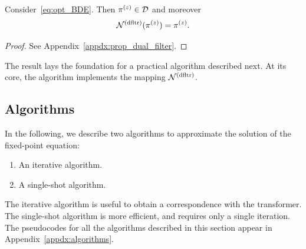 \documentclass[twoside,11pt]{article}
\def\clD{{\cal D}}
\def\clD{{\cal D}}
\def\clN{{\cal N}}
\def\dfltr{{\text{\rm (dfltr)}}}
\begin{document}
\begin{proposition}\label{prop:dual_filter}
Consider~\eqref{eq:opt_BDE}.  Then $\pi^{(z)}\in \clD$ and moreover
  \begin{equation*}
  \clN^\dfltr (\pi^{(z)}) = \pi^{(z)}.
  \end{equation*}
\end{proposition}
\begin{proof}
  See Appendix~\ref{appdx:prop_dual_filter}.
\end{proof}

The result lays the foundation for a practical algorithm described next.  At its core, the 
algorithm implements the mapping $\clN^\dfltr$.



\subsection{Algorithms}
\label{sec:algo_for_dual_filter}




In the following, we describe two algorithms to approximate the
solution of the fixed-point equation:
\begin{enumerate}
\item An iterative algorithm.  
\item A single-shot algorithm. 
\end{enumerate}
The iterative algorithm is useful to obtain a correspondence with the transformer.  
The single-shot algorithm is more efficient, and requires only a single iteration.  
The pseudocodes for all the algorithms described in this section appear in Appendix~\ref{appdx:algorithms}.
\end{document}
